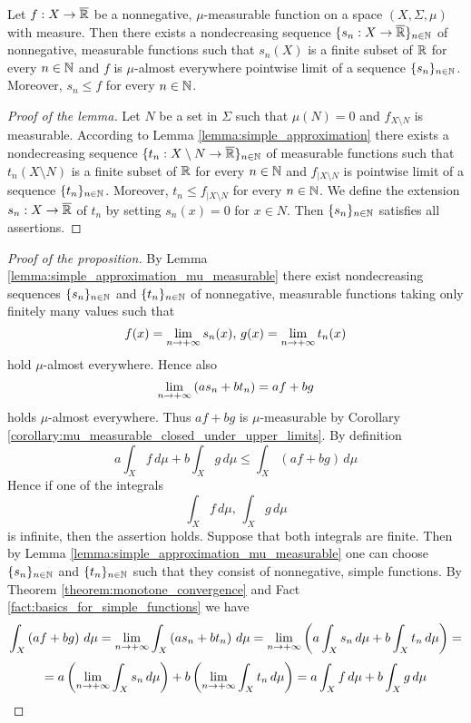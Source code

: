 \begin{lemma}\label{lemma:simple_approximation_mu_measurable}
Let $f:X\rightarrow \overline{{\mathbb R}}$ be a nonnegative, $\mu$-measurable function on a space $(X,\Sigma,\mu)$ with measure. Then there exists a nondecreasing sequence $\{s_n:X\rightarrow \overline{{\mathbb R}}\}_{n\in {\mathbb N}}$ of nonnegative, measurable functions such that $s_n(X)$ is a finite subset of ${\mathbb R}$ for every $n\in {\mathbb N}$ and $f$ is $\mu$-almost everywhere pointwise limit of a sequence $\{s_n\}_{n\in {\mathbb N}}$. Moreover, $s_n\leq f$ for every $n\in {\mathbb N}$.
\end{lemma}
\begin{proof}[Proof of the lemma]
Let $N$ be a set in $\Sigma$ such that $\mu(N) = 0$ and $f_{X\setminus N}$ is measurable. According to Lemma \ref{lemma:simple_approximation} there exists a nondecreasing sequence $\{t_n:X\setminus N\rightarrow \overline{{\mathbb R}}\}_{n\in {\mathbb N}}$ of measurable functions such that $t_n(X\setminus N)$ is a finite subset of ${\mathbb R}$ for every $n\in {\mathbb N}$ and $f_{\mid X\setminus N}$ is pointwise limit of a sequence $\{t_n\}_{n\in {\mathbb N}}$. Moreover, $t_n\leq f_{\mid X\setminus N}$ for every $n\in {\mathbb N}$. We define the extension $s_n:X\rightarrow \overline{{\mathbb R}}$ of $t_n$ by setting $s_n(x) = 0$ for $x\in N$. Then $\{s_n\}_{n\in {\mathbb N}}$ satisfies all assertions. 
\end{proof}

\begin{proof}[Proof of the proposition]
By Lemma \ref{lemma:simple_approximation_mu_measurable} there exist nondecreasing sequences $\{s_n\}_{n\in {\mathbb N}}$ and $\{t_n\}_{n\in {\mathbb N}}$ of nonnegative, measurable functions taking only finitely many values such that $$f(x) = \lim_{n\rightarrow +\infty}s_n(x),\,g(x) = \lim_{n\rightarrow +\infty}t_n(x)$$
hold $\mu$-almost everywhere. Hence also
$$\lim_{n \rightarrow +\infty}\left(as_n + bt_n\right) = af + bg$$
holds $\mu$-almost everywhere. Thus $af+bg$ is $\mu$-measurable by Corollary \ref{corollary:mu_measurable_closed_under_upper_limits}.
By definition
$$a \int_Xf\,d\mu + b \int_Xg\,d\mu \leq \int_X\left(a f+b  g\right)\,d\mu $$
Hence if one of the integrals
$$\int_Xf\,d\mu,\,\int_Xg\,d\mu$$
is infinite, then the assertion holds. Suppose that both integrals are finite. Then by Lemma \ref{lemma:simple_approximation_mu_measurable} one can choose $\{s_n\}_{n\in {\mathbb N}}$ and $\{t_n\}_{n\in {\mathbb N}}$ such that they consist of nonnegative, simple functions. By Theorem \ref{theorem:monotone_convergence} and Fact \ref{fact:basics_for_simple_functions} we have
$$\int_X\left(a f + b g\right)\,d\mu = \lim_{n\rightarrow +\infty}\int_X\left(a s_n + b t_n\right)\,d\mu = \lim_{n\rightarrow +\infty}\left(a \int_Xs_n\,d\mu + b \int_Xt_n\,d\mu\right) =$$
$$=a  \left(\lim_{n\rightarrow +\infty}\int_Xs_n\,d\mu\right) + b \left(\lim_{n\rightarrow +\infty}\int_Xt_n\,d\mu\right) = a \int_Xf\,d\mu + b \int_Xg\,d\mu$$
\end{proof}

